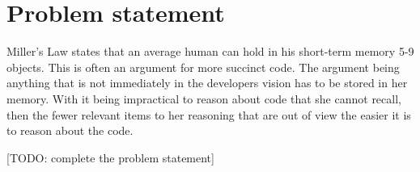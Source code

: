 \section{Problem statement}

Miller's Law\cite{miller1956magical} states that an average human can hold in his short-term memory 5-9 objects.
This is often an argument for more succinct code.  
The argument being anything that is not immediately in the developers vision has to be stored in her memory.
With it being impractical to reason about code that she cannot recall, then the fewer relevant items to her reasoning that are out of view the easier it is to reason about the code.

[TODO: complete the problem statement]

